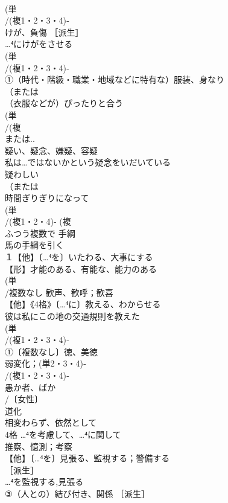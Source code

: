 \documentclass[8pt]{extreport}
\begin{document}
\begin{CJK}{UTF8}{min}
\\	(単
\\	/(複1・2・3・4)‐
\\	けが、負傷 ［派生］ 
\\	…⁴にけがをさせる
\\	(単
\\	/(複1・2・3・4)‐
\\	①（時代・階級・職業・地域などに特有な）服装、身なり 
\\	（または
\\	（衣服などが）ぴったりと合う
\\	(単
\\	/(複
\\	または..
\\	疑い、疑念、嫌疑、容疑 
\\	私は…ではないかという疑念をいだいている 
\\	疑わしい
\\	（または
\\	時間ぎりぎりになって
\\	(単
\\	/(複1・2・4)- (複
\\	ふつう複数で 手綱 
\\	馬の手綱を引く
\\	１【他】〔…⁴を〕いたわる、大事にする
\\	【形】才能のある、有能な、能力のある 
\\	(単
\\	/複数なし 歓声、歓呼；歓喜
\\	【他】《4格》〔…⁴に〕教える、わからせる 
\\	彼は私にこの地の交通規則を教えた
\\	(単
\\	/(複1・2・3・4)‐
\\	①〔複数なし〕徳、美徳 
\\	弱変化；(単2・3・4)‐
\\	/(複1・2・3・4)‐
\\	愚か者、ばか 
\\	/〔女性〕
\\	道化
\\	相変わらず、依然として
\\	4格	…⁴を考慮して、…⁴に関して
\\	推察、憶測；考察 
\\	【他】〔…⁴を〕見張る、監視する；警備する 
\\	［派生］ 
\\	…⁴を監視する,見張る
\\	③（人との）結び付き、関係 ［派生］ 

\end{CJK}
\end{document}
